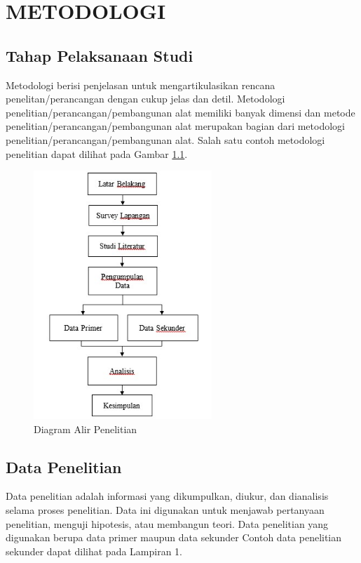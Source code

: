 \chapter{METODOLOGI}

\section{Tahap Pelaksanaan Studi}
Metodologi berisi penjelasan untuk mengartikulasikan rencana penelitan/perancangan dengan cukup jelas dan detil. Metodologi penelitian/perancangan/pembangunan alat memiliki banyak dimensi dan metode penelitian/perancangan/pembangunan alat merupakan bagian dari metodologi penelitian/perancangan/pembangunan alat. Salah satu contoh metodologi penelitian dapat dilihat pada Gambar \ref{fig:diagram}.

\begin{figure}[h!]
    \centering
    \includegraphics[width=0.6\textwidth]{gambar/diagram.jpg}
    \caption{Diagram Alir Penelitian}
    \label{fig:diagram}
\end{figure}

\section{Data Penelitian}
Data penelitian adalah informasi yang dikumpulkan, diukur, dan dianalisis selama proses penelitian. Data ini digunakan untuk menjawab pertanyaan penelitian, menguji hipotesis, atau membangun teori. Data penelitian yang digunakan berupa data primer maupun data sekunder Contoh data penelitian sekunder dapat dilihat pada Lampiran 1.

